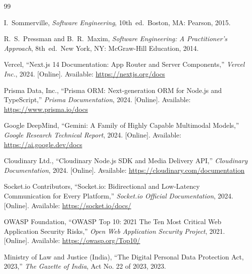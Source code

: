 \documentclass[12pt, a4paper, oneside]{report}
\begin{document}
\begin{thebibliography}{99}

I.~Sommerville, \textit{Software Engineering}, 10th~ed.\ Boston, MA: Pearson, 2015.

R.~S.~Pressman and B.~R.~Maxim, \textit{Software Engineering: A Practitioner's Approach}, 8th~ed.\ New York, NY: McGraw-Hill Education, 2014.

Vercel, ``Next.js 14 Documentation: App Router and Server Components,'' \textit{Vercel Inc.}, 2024. [Online]. Available: \url{https://nextjs.org/docs}

Prisma Data, Inc., ``Prisma ORM: Next-generation ORM for Node.js and TypeScript,'' \textit{Prisma Documentation}, 2024. [Online]. Available: \url{https://www.prisma.io/docs}

Google DeepMind, ``Gemini: A Family of Highly Capable Multimodal Models,'' \textit{Google Research Technical Report}, 2024. [Online]. Available: \url{https://ai.google.dev/docs}

Cloudinary Ltd., ``Cloudinary Node.js SDK and Media Delivery API,'' \textit{Cloudinary Documentation}, 2024. [Online]. Available: \url{https://cloudinary.com/documentation}

Socket.io Contributors, ``Socket.io: Bidirectional and Low-Latency Communication for Every Platform,'' \textit{Socket.io Official Documentation}, 2024. [Online]. Available: \url{https://socket.io/docs/}

OWASP Foundation, ``OWASP Top 10: 2021 The Ten Most Critical Web Application Security Risks,'' \textit{Open Web Application Security Project}, 2021. [Online]. Available: \url{https://owasp.org/Top10/}

Ministry of Law and Justice (India), ``The Digital Personal Data Protection Act, 2023,'' \textit{The Gazette of India}, Act No. 22 of 2023, 2023.

\end{thebibliography}
\end{document}
